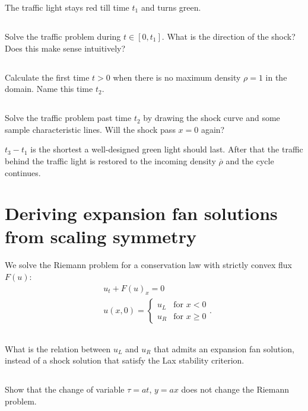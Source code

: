 \documentclass[11pt,letterpaper]{report}
\begin{document}
The traffic light stays red till time $t_1$ and turns green. 

\subsection{}
Solve the traffic problem during $t\in[0,t_1]$. What is the direction of the shock? Does this make sense intuitively?

\subsection{}
Calculate the first time $t>0$ when there is no maximum density $\rho=1$ in the domain. Name this time $t_2$.

\subsection{}
Solve the traffic problem past time $t_2$ by drawing the shock curve and some sample characteristic lines. Will the shock pass $x=0$ again? 

$t_3-t_1$ is the shortest a well-designed green light should last. After that the traffic behind the traffic light is restored to the incoming density $\overline{\rho}$ and the cycle continues.

\section{Deriving expansion fan solutions from scaling symmetry}
We solve the Riemann problem for a conservation law with strictly convex flux $F(u)$:
\begin{align}
    & u_t+F(u)_x = 0\\
    & u(x,0) = \begin{cases}
        u_L &\text{for }x<0\\
        u_R &\text{for }x\geq 0
    \end{cases}.
\end{align}

\subsection{}
What is the relation between $u_L$ and $u_R$ that admits an expansion fan solution, instead of a shock solution that satisfy the Lax stability criterion. 

\subsection{}
Show that the change of variable $\tau=at$, $y=ax$ does not change the Riemann problem. 
\end{document}
